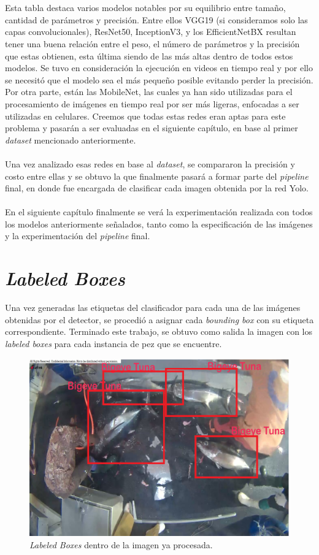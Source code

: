 \\\\
Esta tabla destaca varios modelos notables por su equilibrio entre 
tamaño, cantidad de parámetros y precisión. Entre ellos VGG19 
(si consideramos solo las capas convolucionales), ResNet50, InceptionV3, 
y los EfficientNetBX resultan tener una buena relación entre el peso, el 
número de parámetros y la precisión que estas obtienen, esta última 
siendo de las más altas dentro de todos estos modelos. Se tuvo en 
consideración la ejecución en videos en tiempo real y por ello se necesitó 
que el modelo sea el más pequeño posible evitando perder la precisión. Por 
otra parte, están las MobileNet, las cuales ya han sido utilizadas para el 
procesamiento de imágenes en tiempo real por ser más ligeras, enfocadas a 
ser utilizadas en celulares. Creemos que todas estas redes eran aptas para 
este problema y pasarán a ser evaluadas en el siguiente capítulo, en base 
al primer \textit{dataset} mencionado anteriormente. \\\\
Una vez analizado esas redes en base al \textit{dataset}, se compararon 
la precisión y costo entre ellas y se obtuvo la que finalmente pasará a 
formar parte del \textit{pipeline} final, en donde fue encargada de 
clasificar cada imagen obtenida por la red Yolo.\\\\
En el siguiente capítulo finalmente se verá la experimentación realizada con todos 
los modelos anteriormente señalados, tanto como la especificación de las 
imágenes y la experimentación del \textit{pipeline} final.

\section{\textit{Labeled Boxes}}
Una vez generadas las etiquetas del clasificador para cada una de las 
imágenes obtenidas por el detector, se procedió a asignar cada 
\textit{bounding box} con su etiqueta correspondiente. Terminado este 
trabajo, se obtuvo como salida la imagen con los \textit{labeled boxes} 
para cada instancia de pez que se encuentre. 

\begin{figure}[h!]
    \includegraphics[width=1\textwidth]{images/BoundingBox.png}
    \caption{\textit{Labeled Boxes} dentro de la imagen ya procesada. }
    \label{fig:LabelBoxes}
\end{figure}
